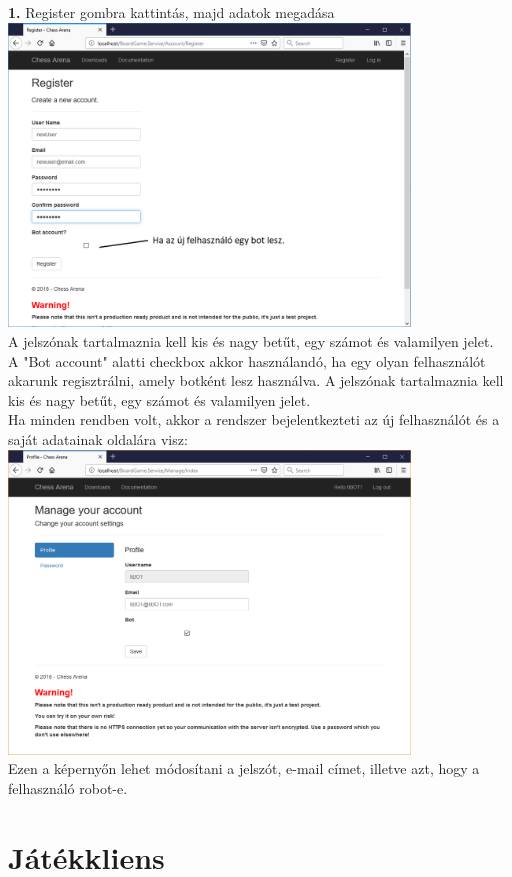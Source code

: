 \documentclass[twoside, a4paper, 12pt]{article}
\begin{document}
\noindent \textbf{1.} Register gombra kattintás, majd adatok megadása \\
\includegraphics[width=0.8\textwidth]{img/service_register.png} \\
A jelszónak tartalmaznia kell kis és nagy betűt, egy számot és valamilyen jelet.\\
A "Bot account" alatti checkbox akkor használandó, ha egy olyan felhasználót akarunk regisztrálni, amely botként lesz használva. A jelszónak tartalmaznia kell kis és nagy betűt, egy számot és valamilyen jelet. \\
Ha minden rendben volt, akkor a rendszer bejelentkezteti az új felhasználót és a saját adatainak oldalára visz: \\
\includegraphics[width=0.8\textwidth]{img/service_account.png} \\
Ezen a képernyőn lehet módosítani a jelszót, e-mail címet, illetve azt, hogy a felhasználó robot-e.

\section{Játékkliens}
\end{document}
